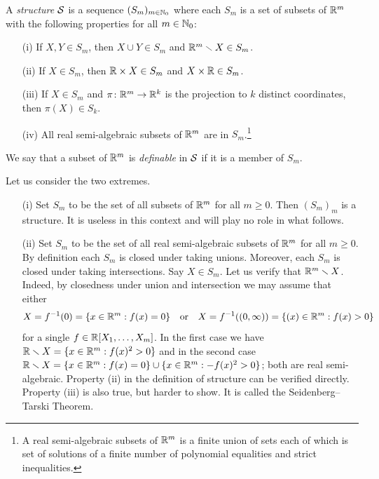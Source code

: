 \begin{definition}
  \label{def:structure}
  A \emph{structure} ${\mathcal S}$ is a sequence $(S_m)_{m\in{\mathbb{N}}_0}$
  where each $S_m$ is a set of subsets of ${\mathbb{R}}^m$ with the following
  properties for all $m\in {\mathbb{N}}_0$:
  \begin{enumerate}
  \item [(i)] If $X,Y\in S_m$, then $X\cup Y\in S_m$ and
    ${\mathbb{R}}^m\smallsetminus X\in S_m$.
  \item[(ii)] If $X\in S_m$, then ${\mathbb{R}}\times X\in S_m$ and $X\times
    {\mathbb{R}}\in S_m$.
  \item[(iii)] If $X\in S_{m}$ and $\pi\colon
    {\mathbb{R}}^{m}\rightarrow{\mathbb{R}}^k$ is the projection to $k$ distinct
    coordinates, then 
    $\pi(X)\in S_k$.
  \item[(iv)] All real semi-algebraic subsets of ${\mathbb{R}}^m$ are in
    $S_m$.\footnote{A real semi-algebraic subsets of ${\mathbb{R}}^m$ is a
      finite union of sets each of which is set of 
      solutions of a finite number of polynomial equalities and
      strict inequalities.}    
  \end{enumerate}
  We say that a subset of  ${\mathbb{R}}^m$ is \emph{definable} in ${\mathcal S}$ if it
  is a member of $S_m$.
\end{definition}

\begin{example} Let us consider the two extremes.
  \begin{enumerate}
  \item [(i)] Set $S_m$ to be the set of all subsets of ${\mathbb{R}}^m$ for
    all $m\ge 0$. Then $(S_m)_m$ is a structure. It is useless in this
    context and will play no role
    in what follows.
  \item[(ii)]
    Set $S_m$ to be the set of all real semi-algebraic subsets of ${\mathbb{R}}^m$
    for all $m\ge 0$. By definition each $S_m$ is closed under taking
    unions. Moreover, each $S_m$ is closed under taking intersections.    
    Say $X\in S_m$. Let us  verify that ${\mathbb{R}}^m \smallsetminus X$. Indeed, by
    closedness under union and intersection we may assume that either 
    \begin{equation*}
      X = f^{-1}(0)=\{ x\in{\mathbb{R}}^m : f(x) = 0\}
      \quad\text{or}\quad       X = f^{-1}((0,\infty))=\{ (x)\in{\mathbb{R}}^m : f(x) > 0\}
    \end{equation*}
    for a single $f\in{\mathbb{R}}[X_1,\ldots,X_m]$. In the first case
    we have ${\mathbb{R}}\smallsetminus X=\{x\in{\mathbb{R}}^m : f(x)^2 > 0\}$ and in the second
    case
    ${\mathbb{R}}\smallsetminus X = \{x\in{\mathbb{R}}^m : f(x)=0\} \cup \{x\in {\mathbb{R}}^m: -f(x)^2 >
    0\}$; both are real semi-algebraic.
    Property (ii) in the definition of structure can be verified
    directly. Property (iii) is also true, but harder to show. It
    is called the Seidenberg--Tarski Theorem.
  \end{enumerate}
\end{example}



